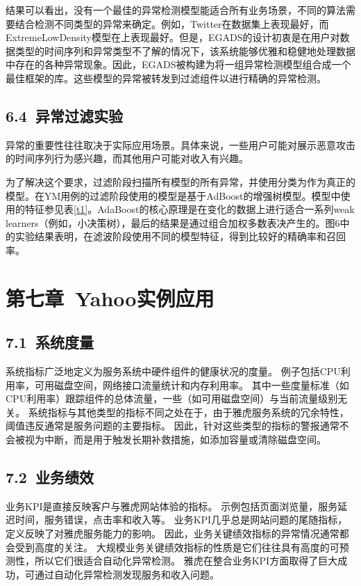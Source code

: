 \documentclass[a4paper,AutoFakeBold,oneside,12pt]{book}
\begin{document}
结果可以看出，没有一个最佳的异常检测模型能适合所有业务场景，不同的算法需要结合检测不同类型的异常来确定。例如，Twitter在数据集上表现最好，而ExtremeLowDensity模型在上表现最好。但是，EGADS的设计初衷是在用户对数据类型的时间序列和异常类型不了解的情况下，该系统能够优雅和稳健地处理数据中存在的各种异常现象。因此，EGADS被构建为将一组异常检测模型组合成一个最佳框架的库。这些模型的异常被转发到过滤组件以进行精确的异常检测。

\section*{6.4\ 异常过滤实验}

异常的重要性往往取决于实际应用场景。具体来说，一些用户可能对展示恶意攻击的时间序列行为感兴趣，而其他用户可能对收入有兴趣。

为了解决这个要求，过滤阶段扫描所有模型的所有异常，并使用分类为作为真正的模型。在YM用例的过滤阶段使用的模型是基于AdBoost的增强树模型。模型中使用的特征参见表\ref{t1}。AdaBoost的核心原理是在变化的数据上进行适合一系列weak learners（例如，小决策树），最后的结果是通过组合加权多数表决产生的。图6中的实验结果表明，在滤波阶段使用不同的模型特征，得到比较好的精确率和召回率。


\chapter*{第七章\ Yahoo实例应用}

\section*{7.1\ 系统度量}
系统指标广泛地定义为服务系统中硬件组件的健康状况的度量。 例子包括CPU利用率，可用磁盘空间，网络接口流量统计和内存利用率。 其中一些度量标准（如CPU利用率）跟踪组件的总体流量，一些（如可用磁盘空间）与当前流量级别无关。 系统指标与其他类型的指标不同之处在于，由于雅虎服务系统的冗余特性，阈值违反通常是服务问题的主要指标。 因此，针对这些类型的指标的警报通常不会被视为中断，而是用于触发长期补救措施，如添加容量或清除磁盘空间。

\section*{7.2\ 业务绩效}
业务KPI是直接反映客户与雅虎网站体验的指标。 示例包括页面浏览量，服务延迟时间，服务错误，点击率和收入等。 业务KPI几乎总是网站问题的尾随指标，定义反映了对雅虎服务能力的影响。 因此，业务关键绩效指标的异常情况通常都会受到高度的关注。 大规模业务关键绩效指标的性质是它们往往具有高度的可预测性，所以它们很适合自动化异常检测。 雅虎在整合业务KPI方面取得了巨大成功，可通过自动化异常检测发现服务和收入问题。
\end{document}
